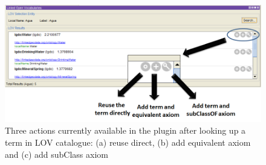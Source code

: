 \begin{figure}[!bht]
\center
\includegraphics[scale=0.5]{img/LOVOptions.png}
\caption{Three actions currently available in the plugin after looking up a term in LOV catalogue: (a) reuse direct, (b) add equivalent axiom and (c) add subClass axiom}
\label{fig:LOVoptions}
\end{figure}
